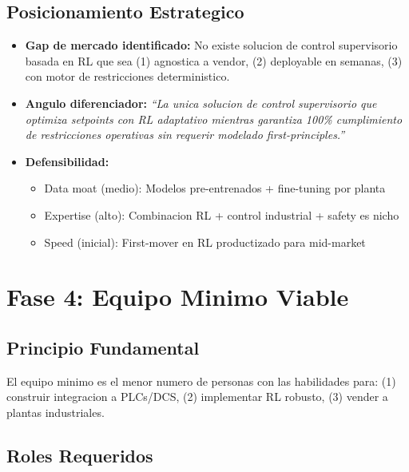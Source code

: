 \documentclass[11pt,a4paper]{article}
\begin{document}
\subsection{Posicionamiento Estrategico}

\begin{itemize}[leftmargin=*]
    \item \textbf{Gap de mercado identificado:} No existe solucion de control supervisorio basada en RL que sea (1) agnostica a vendor, (2) deployable en semanas, (3) con motor de restricciones deterministico.
    
    \item \textbf{Angulo diferenciador:} \textit{``La unica solucion de control supervisorio que optimiza setpoints con RL adaptativo mientras garantiza 100\% cumplimiento de restricciones operativas sin requerir modelado first-principles.''}
    
    \item \textbf{Defensibilidad:}
    \begin{itemize}
        \item Data moat (medio): Modelos pre-entrenados + fine-tuning por planta
        \item Expertise (alto): Combinacion RL + control industrial + safety es nicho
        \item Speed (inicial): First-mover en RL productizado para mid-market
    \end{itemize}
\end{itemize}

\newpage
\section{Fase 4: Equipo Minimo Viable}

\subsection{Principio Fundamental}

\begin{tcolorbox}[colback=grisclaro,colframe=azuloscuro]
El equipo minimo es el menor numero de personas con las habilidades para: (1) construir integracion a PLCs/DCS, (2) implementar RL robusto, (3) vender a plantas industriales.
\end{tcolorbox}

\subsection{Roles Requeridos}
\end{document}
